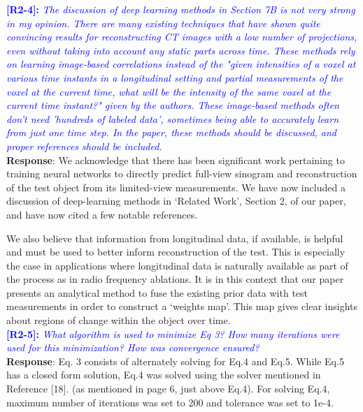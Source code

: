 \documentclass[11pt]{article}
\begin{document}
\vspace{0.5cm}\textcolor{blue}{\textbf{[R2-4]:} \textit{The discussion of deep learning methods in Section 7B is not very strong in my opinion. There are many existing techniques that have shown quite convincing results for reconstructing CT images with a low number of projections, even without taking into account any static parts across time. These methods rely on learning image-based correlations instead of the "given intensities of a voxel at various time instants in a longitudinal setting and partial measurements of the voxel at the current time, what will be the intensity of the same voxel at the current time instant?" given by the authors. These image-based methods often don't need 'hundreds of labeled data', sometimes being able to accurately learn from just one time step. In the paper, these methods should be discussed, and proper references should be included.}}\\

\textbf{Response}: We acknowledge that there has been significant work pertaining to training neural networks to directly predict full-view sinogram and reconstruction of the test object from its limited-view measurements. We have now included a discussion of deep-learning methods in `Related Work', Section 2, of our paper, and have now cited a few notable references.

We also believe that information from longitudinal data, if available, is helpful and must be used to better inform reconstruction of the test. This is especially the case in applications where longitudinal data is naturally available as part of the process as in radio frequency ablations. It is in this context that our paper presents an analytical method to fuse the existing prior data with test measurements in order to construct a `weights map'. This map gives clear insights about regions of change within the object over time.\\



\vspace{0.5cm}\textcolor{blue}{\textbf{[R2-5]:} \textit{What algorithm is used to minimize Eq 3? How many iterations were used for this minimization? How was convergence ensured?}}\\

\textbf{Response}: Eq. 3 consists of alternately solving for Eq.4 and Eq.5. While Eq.5 has a closed form solution, Eq.4 was solved using the solver mentioned in Reference [18]. (as mentioned in page 6, just above Eq.4). 
For solving Eq.4, maximum number of iterations was set to 200 and tolerance was set to 1e-4.
\end{document}
